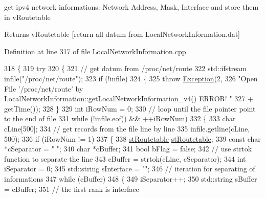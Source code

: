 get ipv4 network informations\-: Network Address, Mask, Interface and store them in v\-Routetable 

\begin{DoxyReturn}{Returns}
v\-Routetable \mbox{[}return all datum from Local\-Network\-Information.\-dat\mbox{]} 
\end{DoxyReturn}


Definition at line 317 of file Local\-Network\-Information.\-cpp.


\begin{DoxyCode}
318 \{
319     \textcolor{keywordflow}{try}
320     \{
321         \textcolor{comment}{// get datum from /proc/net/route}
322         std::ifstream infile(\textcolor{stringliteral}{"/proc/net/route"});
323         \textcolor{keywordflow}{if} (!infile)
324         \{
325             \textcolor{keywordflow}{throw} \hyperlink{classException}{Exception}(2,
326                     \textcolor{stringliteral}{"Open File '/proc/net/route' by
       LocalNetworkInformation::getLocalNetworkInformation\_v4() ERROR! "}
327                             + getTime());
328         \}
329         \textcolor{keywordtype}{int} iRowNum = 0;
330         \textcolor{comment}{// loop until the file pointer point to the end of file}
331         \textcolor{keywordflow}{while} (!infile.eof() && ++iRowNum)
332         \{
333             \textcolor{keywordtype}{char} cLine[500];
334             \textcolor{comment}{// get records from the file line by line}
335             infile.getline(cLine, 500);
336             \textcolor{keywordflow}{if} (iRowNum != 1)
337             \{
338                 \hyperlink{structstRoutetable}{stRoutetable} \hyperlink{structstRoutetable}{stRoutetable};
339                 \textcolor{keyword}{const} \textcolor{keywordtype}{char} *cSeparator = \textcolor{stringliteral}{"   "};
340                 \textcolor{keywordtype}{char} *cBuffer;
341                 \textcolor{keywordtype}{bool} bFlag = \textcolor{keyword}{false};
342                 \textcolor{comment}{// use strtok function to separate the line}
343                 cBuffer = strtok(cLine, cSeparator);
344                 \textcolor{keywordtype}{int} iSeparator = 0;
345                 std::string sInterface = \textcolor{stringliteral}{""};
346                 \textcolor{comment}{// iteration for separating of informations}
347                 \textcolor{keywordflow}{while} (cBuffer)
348                 \{
349                     iSeparator++;
350                     std::string sBuffer = cBuffer;
351                     \textcolor{comment}{// the first rank is interface}

\end{DoxyCode}
